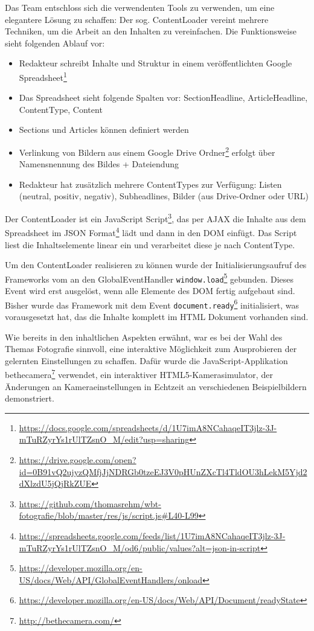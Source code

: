 \documentclass{article}
\begin{document}
Das Team entschloss sich die verwendenten Tools zu verwenden, um eine elegantere L\"osung zu schaffen: Der sog. ContentLoader vereint mehrere Techniken, um die Arbeit an den Inhalten zu vereinfachen. Die Funktionsweise sieht folgenden Ablauf vor:
\begin{itemize}
\item Redakteur schreibt Inhalte und Struktur in einem ver\"offentlichten Google Spreadsheet\footnote{\url{https://docs.google.com/spreadsheets/d/1U7imA8NCahaqeIT3jlz-3J-mTuRZyrYs1rUlTZsnO_M/edit?usp=sharing}}
\item Das Spreadsheet sieht folgende Spalten vor:
SectionHeadline, ArticleHeadline, ContentType, Content
\item Sections und Articles k\"onnen definiert werden
\item Verlinkung von Bildern aus einem Google Drive Ordner\footnote{\url{https://drive.google.com/open?id=0B91vQ2ujyzQMfjJjNDRGb0tzeEJ3V0pHUnZXcTl4TldOU3hLekM5Yjd2dXlzdU5jQjRkZUE}} erfolgt \"uber Namensnennung des Bildes + Dateiendung
\item Redakteur hat zus\"atzlich mehrere ContentTypes zur Verf\"ugung: Listen (neutral, positiv, negativ), Subheadlines, Bilder (aus Drive-Ordner oder URL)

\end{itemize}

Der ContentLoader ist ein JavaScript Script\footnote{\url{https://github.com/thomasrehm/wbt-fotografie/blob/master/res/js/script.js\#L40-L99}}, das per AJAX die Inhalte aus dem Spreadsheet im JSON Format\footnote{\url{https://spreadsheets.google.com/feeds/list/1U7imA8NCahaqeIT3jlz-3J-mTuRZyrYs1rUlTZsnO_M/od6/public/values?alt=json-in-script}} l\"adt und dann in den DOM einf\"ugt. Das Script liest die Inhaltselemente linear ein und verarbeitet diese je nach ContentType.


Um den ContentLoader realisieren zu k\"onnen wurde der Initialisierungsaufruf des Frameworks vom an den GlobalEventHandler \texttt{window.load}\footnote{\url{https://developer.mozilla.org/en-US/docs/Web/API/GlobalEventHandlers/onload}} gebunden. Dieses Event wird erst ausgel\"ost, wenn alle Elemente des DOM fertig aufgebaut sind. Bisher wurde das Framework mit dem Event \texttt{document.ready}\footnote{\url{https://developer.mozilla.org/en-US/docs/Web/API/Document/readyState}} initialisiert, was vorausgesetzt hat, das die Inhalte komplett im HTML Dokument vorhanden sind.

Wie bereits in den inhaltlichen Aspekten erw\"ahnt, war es bei der Wahl des Themas Fotografie sinnvoll, eine interaktive M\"oglichkeit zum Ausprobieren der gelernten Einstellungen zu schaffen. Daf\"ur wurde die JavaScript-Applikation bethecamera\footnote{\url{http://bethecamera.com/}} verwendet, ein interaktiver HTML5-Kamerasimulator, der \"Anderungen an Kameraeinstellungen in Echtzeit an verschiedenen Beispielbildern demonstriert.
\end{document}
